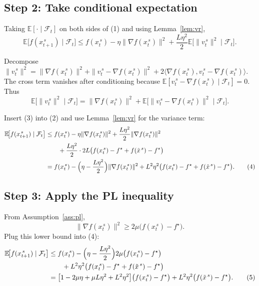 \documentclass{article}
\begin{document}
\subsection*{Step 2: Take conditional expectation}
Taking $\mathbb{E}[\cdot\mid\mathcal{F}_t]$ on both sides of (1) and using Lemma~\ref{lem:vr},
\[
\mathbb{E}\!\bigl[f(x_{t+1}^{\,s})\mid\mathcal{F}_t\bigr]
\le f(x_t^{\,s})-\eta\|\nabla f(x_t^{\,s})\|^{2}
+\frac{L\eta^{2}}{2}\mathbb{E}\!\bigl[\|v_t^{\,s}\|^{2}\mid\mathcal{F}_t\bigr]. \tag{2}
\]

Decompose $\|v_t^{\,s}\|^{2}=\|\nabla f(x_t^{\,s})\|^{2}
+\|v_t^{\,s}-\nabla f(x_t^{\,s})\|^{2}
+2\langle\nabla f(x_t^{\,s}),v_t^{\,s}-\nabla f(x_t^{\,s})\rangle$.
The cross term vanishes after conditioning because $\mathbb{E}[v_t^{\,s}-\nabla f(x_t^{\,s})\mid\mathcal{F}_t]=0$.
Thus
\[
\mathbb{E}\!\bigl[\|v_t^{\,s}\|^{2}\mid\mathcal{F}_t\bigr]
= \|\nabla f(x_t^{\,s})\|^{2}
+ \mathbb{E}\!\bigl[\|v_t^{\,s}-\nabla f(x_t^{\,s})\|^{2}\mid\mathcal{F}_t\bigr]. \tag{3}
\]

Insert (3) into (2) and use Lemma~\ref{lem:vr} for the variance term:
\[
\begin{aligned}
\mathbb{E}\!\bigl[f(x_{t+1}^{\,s})\mid\mathcal{F}_t\bigr]
&\le f(x_t^{\,s})-\eta\|\nabla f(x_t^{\,s})\|^{2}
+\frac{L\eta^{2}}{2}\|\nabla f(x_t^{\,s})\|^{2}\\
&\qquad+\frac{L\eta^{2}}{2}\cdot 2L\bigl(f(x_t^{\,s})-f^\star+f(\tilde{x}^{\,s})-f^\star\bigr)\\
&= f(x_t^{\,s})-\Bigl(\eta-\frac{L\eta^{2}}{2}\Bigr)\|\nabla f(x_t^{\,s})\|^{2}
+L^{2}\eta^{2}\bigl(f(x_t^{\,s})-f^\star+f(\tilde{x}^{\,s})-f^\star\bigr). \tag{4}
\end{aligned}
\]

\subsection*{Step 3: Apply the PL inequality}
From Assumption~\ref{ass:pl},
\[
\|\nabla f(x_t^{\,s})\|^{2}\ge 2\mu\bigl(f(x_t^{\,s})-f^\star\bigr).
\]
Plug this lower bound into (4):
\[
\begin{aligned}
\mathbb{E}\!\bigl[f(x_{t+1}^{\,s})\mid\mathcal{F}_t\bigr]
&\le f(x_t^{\,s})-\Bigl(\eta-\frac{L\eta^{2}}{2}\Bigr)2\mu\bigl(f(x_t^{\,s})-f^\star\bigr)\\
&\qquad+L^{2}\eta^{2}\bigl(f(x_t^{\,s})-f^\star+f(\tilde{x}^{\,s})-f^\star\bigr)\\
&= \bigl[1-2\mu\eta+ \mu L\eta^{2}+L^{2}\eta^{2}\bigr]\bigl(f(x_t^{\,s})-f^\star\bigr)
+L^{2}\eta^{2}\bigl(f(\tilde{x}^{\,s})-f^\star\bigr). \tag{5}
\end{aligned}
\]
\end{document}
